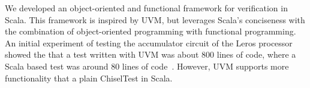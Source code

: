 \documentclass[runningheads]{llncs}
\begin{document}

We developed an object-oriented and functional framework for verification in Scala.
This framework is inspired by UVM, but leverages Scala's conciseness with the
combination of object-oriented programming with functional programming.
An initial experiment of testing the accumulator circuit of the Leros processor~\cite{leros:arcs2019}
showed the that a test written with UVM was about 800 lines of code, where a Scala based
test was around 80 lines of code~\cite{verify:chisel:2020}.
However, UVM supports more functionality that a plain ChiselTest in Scala.

%
%
%
%
\end{document}
